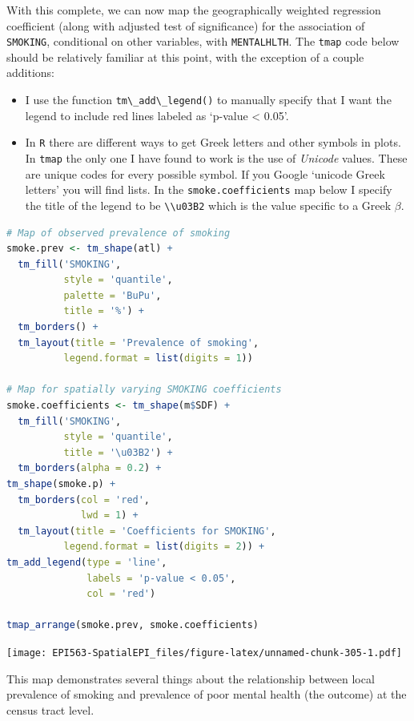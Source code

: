 \documentclass[
]{book}
\newcommand{\passthrough}[1]{#1}
\providecommand{\tightlist}{%
  \setlength{\itemsep}{0pt}\setlength{\parskip}{0pt}}
\begin{document}
With this complete, we can now map the geographically weighted regression coefficient (along with adjusted test of significance) for the association of \passthrough{\lstinline!SMOKING!}, conditional on other variables, with \passthrough{\lstinline!MENTALHLTH!}. The \passthrough{\lstinline!tmap!} code below should be relatively familiar at this point, with the exception of a couple additions:

\begin{itemize}
\tightlist
\item
  I use the function \passthrough{\lstinline!tm\_add\_legend()!} to manually specify that I want the legend to include red lines labeled as `p-value \textless{} 0.05'.
\item
  In \passthrough{\lstinline!R!} there are different ways to get Greek letters and other symbols in plots. In \passthrough{\lstinline!tmap!} the only one I have found to work is the use of \emph{Unicode} values. These are unique codes for every possible symbol. If you Google `unicode Greek letters' you will find lists. In the \passthrough{\lstinline!smoke.coefficients!} map below I specify the title of the legend to be \passthrough{\lstinline!\\u03B2!} which is the value specific to a Greek \(\beta\).
\end{itemize}

\begin{lstlisting}[language=R]
# Map of observed prevalence of smoking
smoke.prev <- tm_shape(atl) +
  tm_fill('SMOKING',
          style = 'quantile',
          palette = 'BuPu',
          title = '%') +
  tm_borders() +
  tm_layout(title = 'Prevalence of smoking',
          legend.format = list(digits = 1))

# Map for spatially varying SMOKING coefficients
smoke.coefficients <- tm_shape(m$SDF) +
  tm_fill('SMOKING',
          style = 'quantile',
          title = '\u03B2') +
  tm_borders(alpha = 0.2) +
tm_shape(smoke.p) +
  tm_borders(col = 'red', 
             lwd = 1) +
  tm_layout(title = 'Coefficients for SMOKING',
          legend.format = list(digits = 2)) +
tm_add_legend(type = 'line',
              labels = 'p-value < 0.05',
              col = 'red')

tmap_arrange(smoke.prev, smoke.coefficients)
\end{lstlisting}

\texttt{[image: EPI563-SpatialEPI\_files/figure-latex/unnamed-chunk-305-1.pdf]}

This map demonstrates several things about the relationship between local prevalence of smoking and prevalence of poor mental health (the outcome) at the census tract level.
\end{document}
